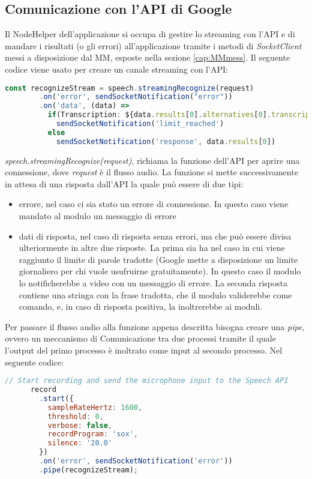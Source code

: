\subsection{Comunicazione con l'API di Google}\label{cap:api}
Il NodeHelper dell'applicazione si occupa di gestire lo streaming con l'API e
di mandare i risultati (o gli errori) all'applicazione tramite i metodi di \emph{SocketClient} messi
a disposizione dal MM, esposte nella sezione \ref{cap:MMmess}.
Il seguente codice viene usato per creare un canale streaming con l'API:
\begin{lstlisting}[language=Javascript, caption={Codice per l'inoltro dell'audio al Servizio Google}, captionpos=b]
      const recognizeStream = speech.streamingRecognize(request)
        .on('error', sendSocketNotification("error"))
        .on('data', (data) =>
          if(Transcription: ${data.results[0].alternatives[0].transcript})
            sendSocketNotification('limit_reached')
          else
            sendSocketNotification('response', data.results[0])
\end{lstlisting}
\emph{speech.streamingRecognize(request)}, richiama la funzione dell'API per aprire una connessione, dove \emph{request} \`e
il flusso audio.
La funzione si mette successivamente in attesa di una risposta dall'API la quale pu\`o essere di due tipi:
\begin{itemize}
\item errore, nel caso ci sia stato un errore di connessione. In questo caso viene mandato al modulo un messaggio di errore
\item dati di risposta, nel caso di risposta senza errori, ma che pu\`o essere divisa ulteriormente in altre due risposte. La prima sia ha nel caso in cui
viene raggiunto il limite di parole tradotte (Google mette a disposizione un limite giornaliero per chi vuole usufruirne gratuitamente). In questo caso
il modulo lo notificherebbe a video con un messaggio di errore. La seconda risposta contiene una stringa con la frase tradotta,
che il modulo validerebbe come comando,
e, in caso di risposta positiva, la inoltrerebbe ai moduli.\\[1\baselineskip]
\end{itemize}
Per passare il flusso audio alla funzione appena descritta bisogna creare una \emph{pipe}, ovvero un meccanismo di Comunicazione
tra due processi tramite il quale l'output del primo processo \`e inoltrato come input al secondo processo.
Nel seguente codice:
\begin{lstlisting}[language=Javascript]
      // Start recording and send the microphone input to the Speech API
      record
        .start({
          sampleRateHertz: 1600,
          threshold: 0,
          verbose: false,
          recordProgram: 'sox',
          silence: '20.0'
        })
        .on('error', sendSocketNotification('error'))
        .pipe(recognizeStream);
\end{lstlisting}

